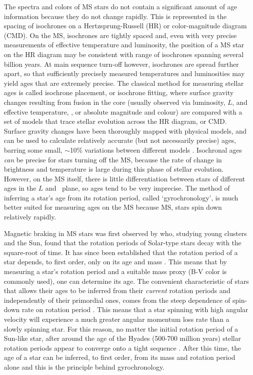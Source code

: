 The spectra and colors of MS stars do not contain a significant amount of age
information because they do not change rapidly.
This is represented in the spacing of isochrones on a Hertzsprung-Russell (HR)
or color-magnitude diagram (CMD).
On the MS, isochrones are tightly spaced and, even with very precise
measurements of effective temperature and luminosity, the position of a MS
star on the HR diagram may be consistent with range of isochrones spanning
several billion years.
At main sequence turn-off however, isochrones are spread further apart, so
that sufficiently precisely measured temperatures and luminosities may yield
ages that are extremely precise.
The classical method for measuring stellar ages is called isochrone placement,
or isochrone fitting, where surface gravity changes resulting from fusion in
the core (usually observed via luminosity, $L$, and effective temperature,
\teff, or absolute magnitude and colour) are compared with a set of models
that trace stellar evolution across the HR diagram, or CMD.
Surface gravity changes have been thoroughly mapped with physical models, and
can be used to calculate relatively accurate (but not necessarily precise)
ages, barring some small, $\sim$10\% variations between different models
\citep[\eg][]{yi2001, dotter2008, dotter2016}.
Isochronal ages {\it can} be precise for stars turning off the MS, because the
rate of change in brightness and temperature is large during this phase of
stellar evolution.
However, on the MS itself, there is little differentiation between stars of
different ages in the $L$ and \teff\ plane, so ages tend to be very imprecise.
The method of inferring a star's age from its rotation period, called
`gyrochronology', is much better suited for measuring ages on the MS because
MS, stars spin down relatively rapidly.

Magnetic braking in MS stars was first observed by \citet{skumanich1972} who,
studying young clusters and the Sun, found that the rotation periods of
Solar-type stars decay with the square-root of time.
It has since been established that the rotation period of a star depends, to
first order, only on its age and mass \citep[\eg][]{barnes2003}.
This means that by measuring a star's rotation period and a suitable mass
proxy (B-V color is commonly used), one can determine its age.
The convenient characteristic of stars that allows their ages to be inferred
from their {\it current} rotation periods and independently of their
primordial ones, comes from the steep dependence of spin-down rate on rotation
period \citep{kawaler1989}.
This means that a star spinning with high angular velocity will experience a
much greater angular momentum loss rate than a slowly spinning star.
For this reason, no matter the initial rotation period of a Sun-like star,
after around the age of the Hyades (500-700 million years) stellar rotation
periods appear to converge onto a tight sequence \citep{irwin2009}.
After this time, the age of a star can be inferred, to first order, from its
mass and rotation period alone and this is the principle behind gyrochronology.

